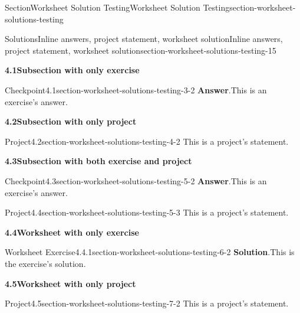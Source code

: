 \documentclass[oneside,10pt,]{article}
\newcommand{\blocktitlefont}{\relax}
\numberwithin{equation}{section}
\begin{document}
\begin{sectionptx}{Section}{Worksheet Solution Testing}{}{Worksheet Solution Testing}{}{}{section-worksheet-solutions-testing}
%
\begin{solutions-subsection}{Solutions}{Inline answers, project statement, worksheet solution}{}{Inline answers, project statement, worksheet solution}{}{}{section-worksheet-solutions-testing-15}
\par\medskip
\noindent\textbf{\normalsize{}4.1\space\textperiodcentered\space{}Subsection with only exercise}
\begin{inlinesolution}{Checkpoint}{4.1}{}{section-worksheet-solutions-testing-3-2}%
\noindent\textbf{\blocktitlefont Answer}.\hypertarget{section-worksheet-solutions-testing-3-2-2-main}{}\quad{}This is an exercise's answer.%
\end{inlinesolution}%
\par\medskip
\noindent\textbf{\normalsize{}4.2\space\textperiodcentered\space{}Subsection with only project}
\begin{projectsolution}{Project}{4.2}{}{section-worksheet-solutions-testing-4-2}%
This is a project's statement.%
\end{projectsolution}%
\par\medskip
\noindent\textbf{\normalsize{}4.3\space\textperiodcentered\space{}Subsection with both exercise and project}
\begin{inlinesolution}{Checkpoint}{4.3}{}{section-worksheet-solutions-testing-5-2}%
\noindent\textbf{\blocktitlefont Answer}.\hypertarget{section-worksheet-solutions-testing-5-2-2-main}{}\quad{}This is an exercise's answer.%
\end{inlinesolution}%
\begin{projectsolution}{Project}{4.4}{}{section-worksheet-solutions-testing-5-3}%
This is a project's statement.%
\end{projectsolution}%
\par\medskip
\noindent\textbf{\normalsize{}4.4\space\textperiodcentered\space{}Worksheet with only exercise}
\begin{divisionsolution}{Worksheet Exercise}{4.4.1}{}{section-worksheet-solutions-testing-6-2}%
\noindent\textbf{\blocktitlefont Solution}.\hypertarget{section-worksheet-solutions-testing-6-2-3-main}{}\quad{}This is the exercise's solution.%
\end{divisionsolution}%
\par\medskip
\noindent\textbf{\normalsize{}4.5\space\textperiodcentered\space{}Worksheet with only project}
\begin{projectsolution}{Project}{4.5}{}{section-worksheet-solutions-testing-7-2}%
This is a project's statement.%
\end{projectsolution}%

\end{solutions-subsection}
\end{sectionptx}
\end{document}
